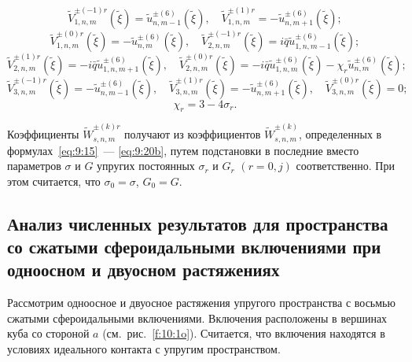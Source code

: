 $$
\tilde V_{1,n,m}^{ \pm ( - 1)r}(\tilde \xi ) = \tilde u_{n,m - 1}^{ \pm (6)}(\tilde \xi ),\quad \tilde V_{1,n,m}^{ \pm (1)r} =  - \tilde u_{n,m + 1}^{ \pm (6)}(\tilde \xi );
$$
$$
\tilde V_{1,n,m}^{ \pm (0)r}(\tilde \xi ) =  - \tilde u_{n,m}^{ \pm (6)}(\tilde \xi ),\quad \tilde V_{2,n,m}^{ \pm ( - 1)r}(\tilde \xi ) = i\bar q\tilde u_{1,n,m - 1}^{ \pm (6)}(\tilde \xi );
$$
$$
\tilde V_{2,n,m}^{ \pm (1)r}(\tilde \xi ) =  - i\bar q\tilde u_{1,n,m + 1}^{ \pm (6)}(\tilde \xi ),\quad \tilde V_{2,n,m}^{ \pm (0)r}(\tilde \xi ) =  - i\bar q\tilde u_{1,n,m}^{ \pm (6)}(\tilde \xi ) - {\chi _r}\tilde u_{n,m}^{ \pm (6)}(\tilde \xi );
$$
$$
\tilde V_{3,n,m}^{ \pm ( - 1)r}(\tilde \xi ) =  - \tilde u_{n,m - 1}^{ \pm (6)}(\tilde \xi ),\quad \tilde V_{3,n,m}^{ \pm (1)r}(\tilde \xi ) =  - \tilde u_{n,m + 1}^{ \pm (6)}(\tilde \xi ),\quad \tilde V_{3,n,m}^{ \pm (0)r}(\tilde \xi ) = 0;
$$
$$
{\chi _r} = 3 - 4{\sigma _r}.
$$

Коэффициенты $\tilde W_{s,n,m}^{ \pm (k)r}$ получают из коэффициентов $\tilde W_{s,n,m}^{ \pm (k)}$, определенных в формулах~\eqref{eq:9:15}~--- \eqref{eq:9:20b}, путем подстановки в последние вместо параметров $\sigma$ и $G$ упругих постоянных $\sigma_r$ и $G_r$ $(r=0,j)$ соответственно. При этом считается, что $\sigma_0=\sigma$, $G_0=G$.

\subsection{Анализ численных результатов для пространства со сжатыми сфероидальными включениями при одноосном и двуосном растяжениях}

Рассмотрим одноосное и двуосное растяжения упругого пространства с восьмью сжатыми сфероидальными включениями. Включения расположены в вершинах куба со стороной $a$ (см.~рис.~\ref{f:10:1o}). Считается, что включения находятся в условиях идеального контакта с упругим пространством.

